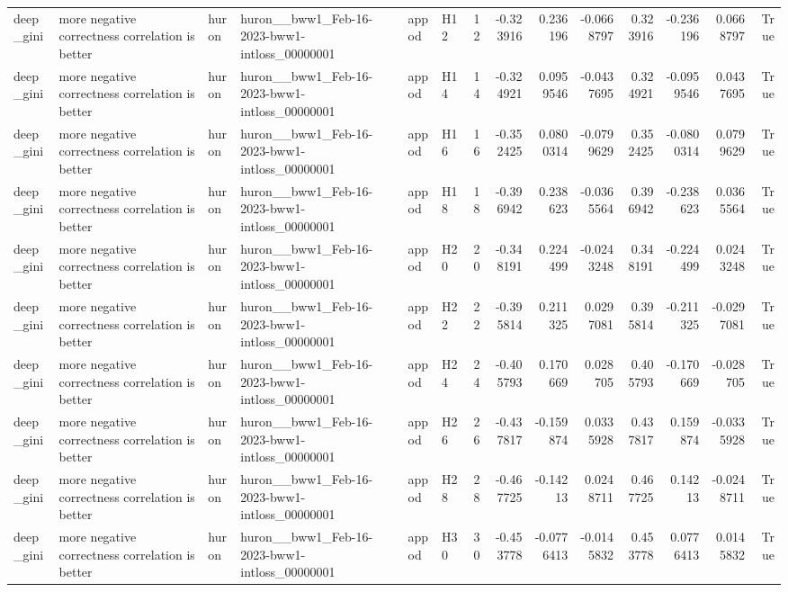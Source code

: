 \begin{longtable}{llllllrrrrrrrr}
deep\_gini & more negative correctness correlation is better & huron & huron\_\_bww1\_Feb-16-2023-bww1-intloss\_00000001 & appod & H12 & 12 & -0.323916 & 0.236196 & -0.0668797 & 0.323916 & -0.236196 & 0.0668797 & True \\
deep\_gini & more negative correctness correlation is better & huron & huron\_\_bww1\_Feb-16-2023-bww1-intloss\_00000001 & appod & H14 & 14 & -0.324921 & 0.0959546 & -0.0437695 & 0.324921 & -0.0959546 & 0.0437695 & True \\
deep\_gini & more negative correctness correlation is better & huron & huron\_\_bww1\_Feb-16-2023-bww1-intloss\_00000001 & appod & H16 & 16 & -0.352425 & 0.0800314 & -0.0799629 & 0.352425 & -0.0800314 & 0.0799629 & True \\
deep\_gini & more negative correctness correlation is better & huron & huron\_\_bww1\_Feb-16-2023-bww1-intloss\_00000001 & appod & H18 & 18 & -0.396942 & 0.238623 & -0.0365564 & 0.396942 & -0.238623 & 0.0365564 & True \\
deep\_gini & more negative correctness correlation is better & huron & huron\_\_bww1\_Feb-16-2023-bww1-intloss\_00000001 & appod & H20 & 20 & -0.348191 & 0.224499 & -0.0243248 & 0.348191 & -0.224499 & 0.0243248 & True \\
deep\_gini & more negative correctness correlation is better & huron & huron\_\_bww1\_Feb-16-2023-bww1-intloss\_00000001 & appod & H22 & 22 & -0.395814 & 0.211325 & 0.0297081 & 0.395814 & -0.211325 & -0.0297081 & True \\
deep\_gini & more negative correctness correlation is better & huron & huron\_\_bww1\_Feb-16-2023-bww1-intloss\_00000001 & appod & H24 & 24 & -0.405793 & 0.170669 & 0.028705 & 0.405793 & -0.170669 & -0.028705 & True \\
deep\_gini & more negative correctness correlation is better & huron & huron\_\_bww1\_Feb-16-2023-bww1-intloss\_00000001 & appod & H26 & 26 & -0.437817 & -0.159874 & 0.0335928 & 0.437817 & 0.159874 & -0.0335928 & True \\
deep\_gini & more negative correctness correlation is better & huron & huron\_\_bww1\_Feb-16-2023-bww1-intloss\_00000001 & appod & H28 & 28 & -0.467725 & -0.14213 & 0.0248711 & 0.467725 & 0.14213 & -0.0248711 & True \\
deep\_gini & more negative correctness correlation is better & huron & huron\_\_bww1\_Feb-16-2023-bww1-intloss\_00000001 & appod & H30 & 30 & -0.453778 & -0.0776413 & -0.0145832 & 0.453778 & 0.0776413 & 0.0145832 & True \\

\end{longtable}
